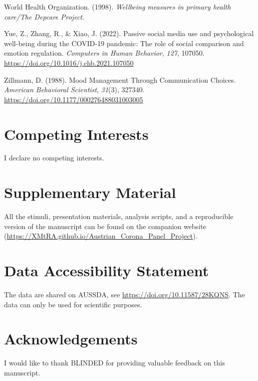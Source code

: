 \documentclass[
  man,mask,floatsintext]{apa7}
\newlength{\cslhangindent}
\newlength{\cslentryspacingunit} %
\newenvironment{CSLReferences}[2] %
 {%
  \setlength{\parindent}{0pt}
  \ifodd #1
  \let\oldpar\par
  \def\par{\hangindent=\cslhangindent\oldpar}
  \fi
  \setlength{\parskip}{#2\cslentryspacingunit}
 }%
 {}
\begin{document}
\begin{CSLReferences}{1}{0}
\leavevmode{}%
World Health Organization. (1998). \emph{Wellbeing measures in primary health care/{The Depcare Project}}.

\leavevmode{}%
Yue, Z., Zhang, R., \& Xiao, J. (2022). Passive social media use and psychological well-being during the {COVID-19} pandemic: {The} role of social comparison and emotion regulation. \emph{Computers in Human Behavior}, \emph{127}, 107050. \url{https://doi.org/10.1016/j.chb.2021.107050}

\leavevmode{}%
Zillmann, D. (1988). Mood {Management Through Communication Choices}. \emph{American Behavioral Scientist}, \emph{31}(3), 327340. \url{https://doi.org/10.1177/000276488031003005}

\end{CSLReferences}

\hypertarget{competing-interests}{%
\section{Competing Interests}\label{competing-interests}}

I declare no competing interests.

\hypertarget{supplementary-material}{%
\section{Supplementary Material}\label{supplementary-material}}

All the stimuli, presentation materials, analysis scripts, and a reproducible version of the manuscript can be found on the companion website (\url{https://XMtRA.github.io/Austrian_Corona_Panel_Project}).

\hypertarget{data-accessibility-statement}{%
\section{Data Accessibility Statement}\label{data-accessibility-statement}}

The data are shared on AUSSDA, see \url{https://doi.org/10.11587/28KQNS}.
The data can only be used for scientific purposes.

\hypertarget{acknowledgements}{%
\section{Acknowledgements}\label{acknowledgements}}

I would like to thank BLINDED for providing valuable feedback on this manuscript.
\end{document}
